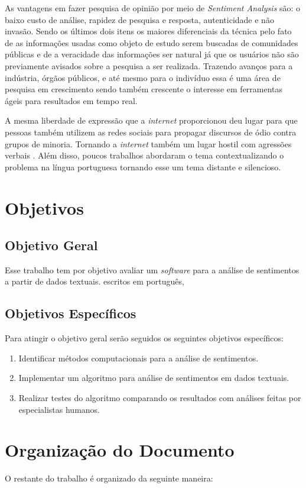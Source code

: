 As vantagens em fazer pesquisa de opinião por meio de \textit{Sentiment Analysis} são: o baixo custo de análise, rapidez de pesquisa e resposta, autenticidade e não invasão. Sendo os últimos dois itens os maiores diferenciais da técnica pelo fato de as informações usadas como objeto de estudo serem buscadas de comunidades públicas e de a veracidade das informações ser natural já que os usuários não são previamente avisados sobre a pesquisa a ser realizada. Trazendo avanços para a indústria, órgãos públicos, e até mesmo para o indivíduo essa é uma área de pesquisa em crescimento sendo também crescente o interesse em ferramentas ágeis para resultados em tempo real. 

A mesma liberdade de expressão que a \textit{internet} proporcionou deu lugar para que pessoas também utilizem as redes sociais para propagar discursos de ódio contra grupos de minoria. Tornando a \textit{internet} também um lugar hostil com agressões verbais \cite{Chetty2018}.  Além disso, poucos trabalhos abordaram o tema contextualizando o problema na língua portuguesa tornando esse um tema distante e silencioso.

\section{Objetivos}
\subsection{Objetivo Geral}    
    Esse trabalho tem por objetivo avaliar um \textit{software} para a análise de sentimentos a partir de dados textuais. escritos em português, 

\subsection{Objetivos Específicos}
    Para atingir o objetivo geral serão seguidos os seguintes objetivos específicos:
\begin{enumerate}
    \item Identificar métodos computacionais para a análise de sentimentos.
    \item Implementar um algoritmo para análise de sentimentos em dados textuais.
    \item Realizar testes do algoritmo comparando os resultados com análises feitas por especialistas humanos.
\end{enumerate}
	
\section{Organização do Documento}
O restante do trabalho é organizado da seguinte maneira:

